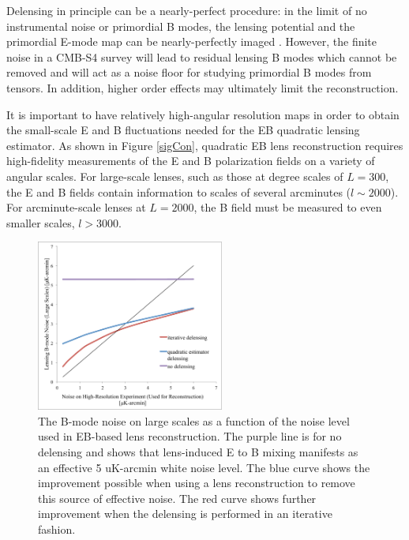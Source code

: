 Delensing in principle can be a nearly-perfect procedure: in the limit of no instrumental noise or primordial B modes, the lensing potential and the primordial E-mode map can be nearly-perfectly imaged \cite{Hirata:2003ka}.  However, the finite noise in a CMB-S4 survey will lead to residual lensing B modes which cannot be removed and will act as a noise floor for studying primordial B modes from tensors.  In addition, higher order effects may ultimately limit the reconstruction.

It is important to have relatively high-angular resolution maps in order to obtain the small-scale E and B fluctuations needed for the EB quadratic lensing estimator.  As shown in Figure \ref{sigCon}, quadratic EB lens reconstruction requires high-fidelity measurements of the E and B polarization fields on a variety of angular scales.  For large-scale lenses, such as those at degree scales of $L=300$, the E and B fields contain information to scales of several arcminutes ($l \sim 2000$).  For arcminute-scale lenses at $L = 2000$, the B field must be measured to even smaller scales, $l > 3000$. 

\begin{figure}[htbp]
\centering
\includegraphics[width=0.55\textwidth]{CMBLensing/delensPlot.pdf}
\vspace{0.3cm}
\caption{The B-mode noise on large scales as a function of the noise level used in EB-based lens reconstruction.  The purple line is for no delensing and shows that lens-induced  E to B mixing manifests as an effective 5 uK-arcmin white noise level.  The blue curve shows the improvement possible when using a lens reconstruction to remove this source of effective noise.  The red curve shows further improvement when the delensing is performed in an iterative fashion.}
\label{iterative}
\end{figure}


